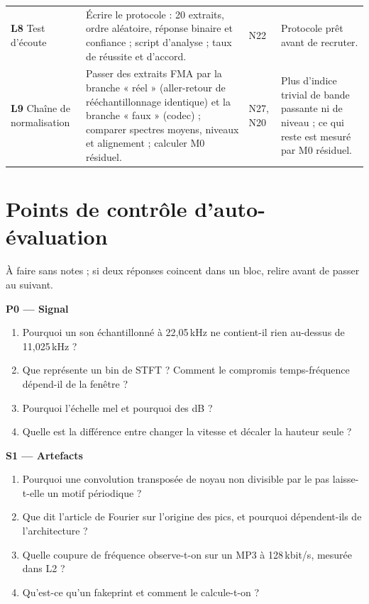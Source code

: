 \documentclass[11pt,a4paper]{article}
\begin{document}
{\begin{longtable}{L{1.9cm}L{6.2cm}L{1.6cm}L{4.4cm}}
\textbf{L8} Test d'écoute & Écrire le protocole : 20 extraits, ordre aléatoire, réponse binaire et confiance ; script d'analyse ; taux de réussite et d'accord. & N22 & Protocole prêt avant de recruter.\\
\textbf{L9} Chaîne de normalisation & Passer des extraits FMA par la branche « réel » (aller-retour de rééchantillonnage identique) et la branche « faux » (codec) ; comparer spectres moyens, niveaux et alignement ; calculer M0 résiduel. & N27, N20 & Plus d'indice trivial de bande passante ni de niveau ; ce qui reste est mesuré par M0 résiduel.\\
\end{longtable}
}

\section{Points de contrôle d'auto-évaluation}
\label{app:checkpoints}

À faire sans notes ; si deux réponses coincent dans un bloc, relire avant de passer au suivant.

\textbf{P0 --- Signal}
\begin{enumerate}
  \item Pourquoi un son échantillonné à 22,05\,kHz ne contient-il rien au-dessus de 11,025\,kHz ?
  \item Que représente un bin de STFT ? Comment le compromis temps-fréquence dépend-il de la fenêtre ?
  \item Pourquoi l'échelle mel et pourquoi des dB ?
  \item Quelle est la différence entre changer la vitesse et décaler la hauteur seule ?
\end{enumerate}

\textbf{S1 --- Artefacts}
\begin{enumerate}
  \item Pourquoi une convolution transposée de noyau non divisible par le pas laisse-t-elle un motif périodique ?
  \item Que dit l'article de Fourier sur l'origine des pics, et pourquoi dépendent-ils de l'architecture ?
  \item Quelle coupure de fréquence observe-t-on sur un MP3 à 128\,kbit/s, mesurée dans L2 ?
  \item Qu'est-ce qu'un fakeprint et comment le calcule-t-on ?
\end{enumerate}
\end{document}
